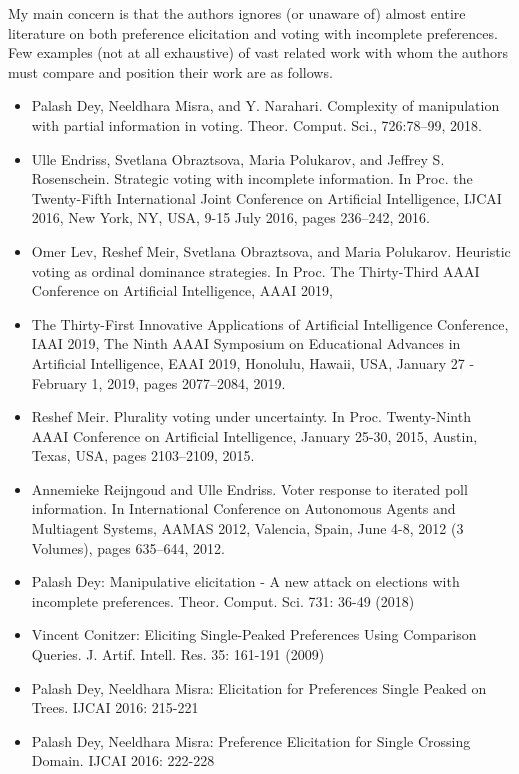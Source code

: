 \documentclass[version=3.21, pagesize, twoside=off, bibliography=totoc, DIV=calc, fontsize=12pt, a4paper]{scrartcl}
\begin{document}
My main concern is that the authors ignores (or unaware of) almost entire literature on both preference elicitation and voting with incomplete preferences. Few examples (not at all exhaustive) of vast related work with whom the authors must compare and position their work are as follows.
\begin{itemize}
	\item Palash Dey, Neeldhara Misra, and Y. Narahari. Complexity of manipulation with partial information in voting. Theor. Comput. Sci., 726:78–99, 2018.
	\item Ulle Endriss, Svetlana Obraztsova, Maria Polukarov, and Jeffrey S. Rosenschein. Strategic voting with incomplete information. In Proc. the Twenty-Fifth International Joint Conference on Artificial Intelligence, IJCAI 2016, New York, NY, USA, 9-15 July 2016, pages 236–242, 2016.
	\item Omer Lev, Reshef Meir, Svetlana Obraztsova, and Maria Polukarov. Heuristic voting as ordinal dominance strategies. In Proc. The Thirty-Third AAAI Conference on Artificial Intelligence, AAAI 2019,
	\item The Thirty-First Innovative Applications of Artificial Intelligence Conference, IAAI 2019, The Ninth AAAI Symposium on Educational Advances in Artificial Intelligence, EAAI 2019, Honolulu, Hawaii, USA, January 27 - February 1, 2019, pages 2077–2084, 2019.
	\item Reshef Meir. Plurality voting under uncertainty. In Proc. Twenty-Ninth AAAI Conference on Artificial Intelligence, January 25-30, 2015, Austin, Texas, USA, pages 2103–2109, 2015.
	\item Annemieke Reijngoud and Ulle Endriss. Voter response to iterated poll information. In International Conference on Autonomous Agents and Multiagent Systems, AAMAS 2012, Valencia, Spain, June 4-8, 2012 (3 Volumes), pages 635–644, 2012.
	\item Palash Dey: Manipulative elicitation - A new attack on elections with incomplete preferences. Theor. Comput. Sci. 731: 36-49 (2018)
	\item Vincent Conitzer: Eliciting Single-Peaked Preferences Using Comparison Queries. J. Artif. Intell. Res. 35: 161-191 (2009)
	\item Palash Dey, Neeldhara Misra: Elicitation for Preferences Single Peaked on Trees. IJCAI 2016: 215-221
	\item Palash Dey, Neeldhara Misra: Preference Elicitation for Single Crossing Domain. IJCAI 2016: 222-228
\end{itemize}
\end{document}
